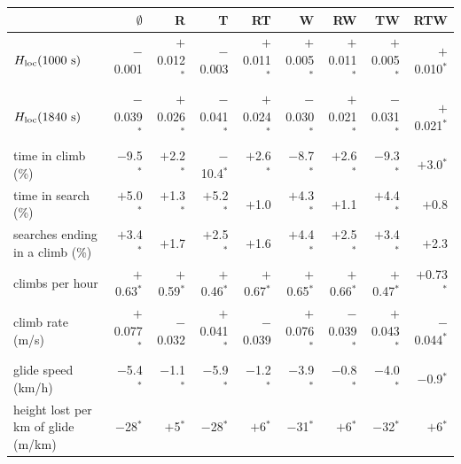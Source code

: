 \begin{tabular}{@{}l r r r r r r r r @{}}
\toprule
 & $\emptyset$ & R & T & RT & W & RW & TW & RTW \\
\midrule
$H_\mathrm{loc}(1000~\mathrm{s})$ & $-$0.001 & $+$0.012$^\ast$ & $-$0.003 & $+$0.011$^\ast$ & $+$0.005$^\ast$ & $+$0.011$^\ast$ & $+$0.005$^\ast$ & $+$0.010$^\ast$ \\
$H_\mathrm{loc}(1840~\mathrm{s})$ & $-$0.039$^\ast$ & $+$0.026$^\ast$ & $-$0.041$^\ast$ & $+$0.024$^\ast$ & $-$0.030$^\ast$ & $+$0.021$^\ast$ & $-$0.031$^\ast$ & $+$0.021$^\ast$ \\
time in climb (\%) & $-$9.5$^\ast$ & $+$2.2$^\ast$ & $-$10.4$^\ast$ & $+$2.6$^\ast$ & $-$8.7$^\ast$ & $+$2.6$^\ast$ & $-$9.3$^\ast$ & $+$3.0$^\ast$ \\
time in search (\%) & $+$5.0$^\ast$ & $+$1.3$^\ast$ & $+$5.2$^\ast$ & $+$1.0 & $+$4.3$^\ast$ & $+$1.1 & $+$4.4$^\ast$ & $+$0.8 \\
searches ending in a climb (\%) & $+$3.4$^\ast$ & $+$1.7 & $+$2.5$^\ast$ & $+$1.6 & $+$4.4$^\ast$ & $+$2.5$^\ast$ & $+$3.4$^\ast$ & $+$2.3 \\
climbs per hour & $+$0.63$^\ast$ & $+$0.59$^\ast$ & $+$0.46$^\ast$ & $+$0.67$^\ast$ & $+$0.65$^\ast$ & $+$0.66$^\ast$ & $+$0.47$^\ast$ & $+$0.73$^\ast$ \\
climb rate (m/s) & $+$0.077$^\ast$ & $-$0.032 & $+$0.041$^\ast$ & $-$0.039 & $+$0.076$^\ast$ & $-$0.039$^\ast$ & $+$0.043$^\ast$ & $-$0.044$^\ast$ \\
glide speed (km/h) & $-$5.4$^\ast$ & $-$1.1$^\ast$ & $-$5.9$^\ast$ & $-$1.2$^\ast$ & $-$3.9$^\ast$ & $-$0.8$^\ast$ & $-$4.0$^\ast$ & $-$0.9$^\ast$ \\
height lost per km of glide (m/km) & $-$28$^\ast$ & $+$5$^\ast$ & $-$28$^\ast$ & $+$6$^\ast$ & $-$31$^\ast$ & $+$6$^\ast$ & $-$32$^\ast$ & $+$6$^\ast$ \\
\bottomrule
\end{tabular}
